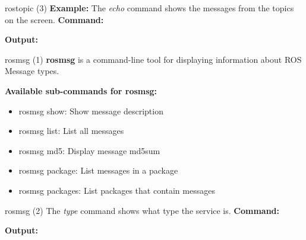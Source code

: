 \documentclass{beamer}
\begin{document}
\begin{frame}{rostopic (3)}
	\textbf{Example:} The \textit{echo} command shows the messages from the topics on the screen.
	\newline
	\textbf{Command:} 
	
	\textbf{Output:}
	
\end{frame}
\begin{frame}{rosmsg (1)}
	\textbf{rosmsg} is a command-line tool for displaying information about ROS Message types.
	\newline
	\newline
	\begin{large}\textbf{Available sub-commands for rosmsg:}\end{large}
	\begin{itemize}
		\item rosmsg show: Show message description 
		\item rosmsg list: List all messages
		\item rosmsg md5: Display message md5sum
		\item rosmsg package: List messages in a package
		\item rosmsg packages: List packages that contain messages
	\end{itemize}
\end{frame}
\begin{frame}{rosmsg (2)}
	The \textit{type} command shows what type the service is.
	\newline
	\textbf{Command:} 
	
	
	\textbf{Output:}
	
\end{frame}
\end{document}

